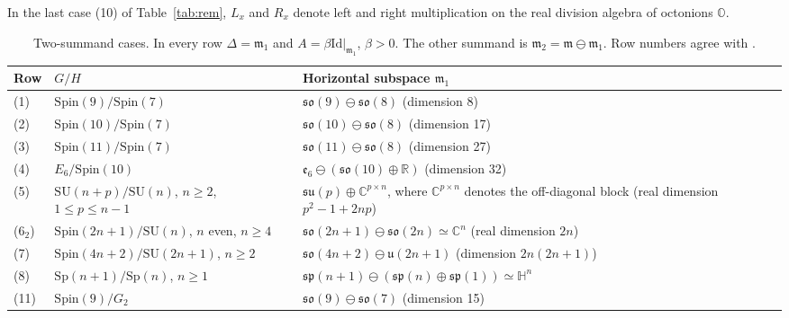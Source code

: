 \documentclass[12pt]{amsart}
\theoremstyle{plain}
\theoremstyle{definition}
\theoremstyle{remark}
\newcommand{\alg}[1]{\mathfrak{#1}}
\newcommand{\RR}{\mathbb{R}}
\newcommand{\CC}{\mathbb{C}}
\newcommand{\HH}{\mathbb{H}}
\newcommand{\OO}{\mathbb{O}}
\newcommand{\Idm}{\mathrm{Id}}
\begin{document}
In the last case (10) of Table~\ref{tab:rem}, $L_x$ and $R_x$ denote left and right multiplication
on the real division algebra  of octonions $\OO$.

\begin{table}[htbp]
\centering
\caption{Two-summand cases. In every row $\Delta=\alg{m}_1$ and $A=\beta\Idm|_{\alg{m}_1}$,
$\beta>0$. The other summand is $\alg{m}_2=\alg{m}\ominus\alg{m}_1$. Row numbers agree with
\cite[Table~1]{ChenNN}.}
\label{tab:two}
\begin{tabular}{@{}l l p{2.7in}@{}}
\toprule
Row & $G/H$ & Horizontal subspace $\alg{m}_1$\\
\midrule
(1) & $\mathrm{Spin}(9)/\mathrm{Spin}(7)$ & $\alg{so}(9)\ominus\alg{so}(8)$ (dimension 8)\\
(2) & $\mathrm{Spin}(10)/\mathrm{Spin}(7)$ & $\alg{so}(10)\ominus\alg{so}(8)$ (dimension 17)\\
(3) & $\mathrm{Spin}(11)/\mathrm{Spin}(7)$ & $\alg{so}(11)\ominus\alg{so}(8)$ (dimension 27)\\
(4) & $E_6/\mathrm{Spin}(10)$ & $\alg{e}_6\ominus(\alg{so}(10)\oplus\RR)$ (dimension 32)\\
(5) & $\mathrm{SU}(n{+}p)/\mathrm{SU}(n)$, $n\ge2$, $1\le p\le n-1$ &
$\alg{su}(p)\oplus\CC^{p\times n}$, where $\CC^{p\times n}$ denotes the off-diagonal block (real
dimension $p^2-1+2np$)\\
(6$_2$) & $\mathrm{Spin}(2n{+}1)/\mathrm{SU}(n)$, $n$ even, $n\ge4$ &
$\alg{so}(2n+1)\ominus\alg{so}(2n)\simeq\CC^n$ (real dimension $2n$)\\
(7) & $\mathrm{Spin}(4n{+}2)/\mathrm{SU}(2n{+}1)$, $n\ge2$ &
$\alg{so}(4n+2)\ominus\alg{u}(2n+1)$ (dimension $2n(2n+1)$)\\
(8) & $\mathrm{Sp}(n{+}1)/\mathrm{Sp}(n)$, $n\ge1$ &
$\alg{sp}(n+1)\ominus(\alg{sp}(n)\oplus\alg{sp}(1))\simeq\HH^n$\\
(11) & $\mathrm{Spin}(9)/G_2$ & $\alg{so}(9)\ominus\alg{so}(7)$ (dimension 15)\\
\bottomrule
\end{tabular}
\end{table}
\end{document}
